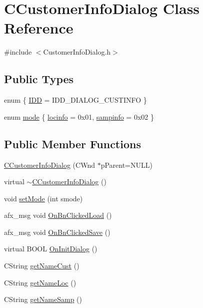\hypertarget{classCCustomerInfoDialog}{
\section{CCustomerInfoDialog Class Reference}
\label{classCCustomerInfoDialog}
}


{\ttfamily \#include $<$CustomerInfoDialog.h$>$}

\subsection*{Public Types}
\begin{DoxyCompactItemize}
\item 
enum \{ \hyperlink{classCCustomerInfoDialog_a593f1b38cc6dbbbe341ce9824a630738a3c292e3b87430c752073c078956ef526}{IDD} =  IDD\_\-DIALOG\_\-CUSTINFO
 \}
\item 
enum \hyperlink{classCCustomerInfoDialog_afc4c5743725bc9dacb788e2715b66d9f}{mode} \{ \hyperlink{classCCustomerInfoDialog_afc4c5743725bc9dacb788e2715b66d9fad8b9fa4733aa332dfcae2691f03885bc}{locinfo} =  0x01, 
\hyperlink{classCCustomerInfoDialog_afc4c5743725bc9dacb788e2715b66d9fa12b3b1457e65f5a47f1e5ea6b00be620}{sampinfo} =  0x02
 \}
\end{DoxyCompactItemize}
\subsection*{Public Member Functions}
\begin{DoxyCompactItemize}
\item 
\hyperlink{classCCustomerInfoDialog_ab33941c69fcc511bb0d1a4670db3b4f6}{CCustomerInfoDialog} (CWnd $\ast$pParent=NULL)
\item 
virtual \hyperlink{classCCustomerInfoDialog_a3f9f96fe98a0d2979af2a9bd129e73ee}{$\sim$CCustomerInfoDialog} ()
\item 
void \hyperlink{classCCustomerInfoDialog_ab927c4a779f9bebc371895f508deedd2}{setMode} (int smode)
\item 
afx\_\-msg void \hyperlink{classCCustomerInfoDialog_a1d088ff4bda2d8c8d0165c8b2269febc}{OnBnClickedLoad} ()
\item 
afx\_\-msg void \hyperlink{classCCustomerInfoDialog_ac34695739cadd2a5dd98a80eb7394040}{OnBnClickedSave} ()
\item 
virtual BOOL \hyperlink{classCCustomerInfoDialog_a3639f0f3a5ca6b6bd53a9cd1b31ba0d5}{OnInitDialog} ()
\item 
CString \hyperlink{classCCustomerInfoDialog_a964e1b5f4950a1d23f42325e0dd34d7b}{getNameCust} ()
\item 
CString \hyperlink{classCCustomerInfoDialog_adbdc665bb1242a8ded293e827c616adf}{getNameLoc} ()
\item 
CString \hyperlink{classCCustomerInfoDialog_ae70b99bb88e900017011ede64bba4f7d}{getNameSamp} ()
\end{DoxyCompactItemize}
